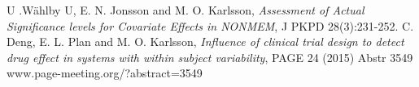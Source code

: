 \begin{thebibliography}{99}
  U .Wählby U, E. N. Jonsson and M. O. Karlsson, 
\emph{Assessment of Actual Significance levels for Covariate Effects in NONMEM}, 
J PKPD 28(3):231-252. 
 C. Deng, E. L. Plan and M. O. Karlsson, {\em Influence of clinical trial design to detect drug effect in systems with within subject variability}, PAGE 24 (2015) Abstr 3549 \mbox{www.page-meeting.org/?abstract=3549} 
\end{thebibliography}



